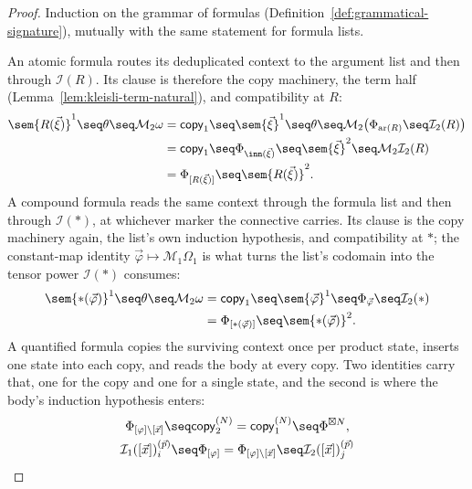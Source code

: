 \begin{proof}
\leanok
Induction on the grammar of formulas
(Definition~\ref{def:grammatical-signature}), mutually with the same
statement for formula lists.

An atomic formula routes its deduplicated context to the argument list and
then through $\mathcal I(R)$. Its clause is therefore the copy machinery,
the term half (Lemma~\ref{lem:kleisli-term-natural}), and compatibility at
$R$:
\begin{align*}
  \sem{R(\vec\xi)}^1 \seq \theta \seq \mathcal M_2\omega
  &= \mathsf{copy}_1 \seq \sem{\vec\xi}^1 \seq \theta \seq
     \mathcal M_2\bigl(\Phi_{\mathrm{ar}(R)} \seq \mathcal I_2(R)\bigr) \\
  &= \mathsf{copy}_1 \seq \Phi_{\inn(\vec\xi)} \seq \sem{\vec\xi}^2
     \seq \mathcal M_2\mathcal I_2(R) \\
  &= \Phi_{[R(\vec\xi)]} \seq \sem{R(\vec\xi)}^2 .
\end{align*}
A compound formula reads the same context through the formula list and then
through $\mathcal I(*)$, at whichever marker the connective carries. Its
clause is the copy machinery again, the list's own induction hypothesis, and
compatibility at $*$; the constant-map identity
$\vec\varphi \mapsto \mathcal M_1\Omega_1$ is what turns the list's codomain
into the tensor power $\mathcal I(*)$ consumes:
\begin{align*}
  \sem{*(\vec\varphi)}^1 \seq \theta \seq \mathcal M_2\omega
  &= \mathsf{copy}_1 \seq \sem{\vec\varphi}^1 \seq \Phi_{\vec\varphi}
     \seq \mathcal I_2(*) \\
  &= \Phi_{[*(\vec\varphi)]} \seq \sem{*(\vec\varphi)}^2 .
\end{align*}
A quantified formula copies the surviving context once per product state,
inserts one state into each copy, and reads the body at every copy. Two
identities carry that, one for the copy and one for a single state, and the
second is where the body's induction hypothesis enters:
\begin{gather*}
  \Phi_{[\varphi]\setminus[\vec x]} \seq \mathsf{copy}_2^{(N)}
    = \mathsf{copy}_1^{(N)} \seq \Phi^{\boxtimes N}, \\
  \mathcal I_1([\vec x])_i^{(\vec p)} \seq \Phi_{[\varphi]}
    = \Phi_{[\varphi]\setminus[\vec x]} \seq \mathcal I_2([\vec x])_j^{(\vec p)}

\end{gather*}
\end{proof}
